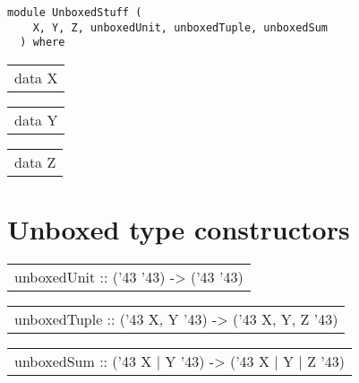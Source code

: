 \label{module:UnboxedStuff}
\haddockbeginheader
{\haddockverb\begin{verbatim}
module UnboxedStuff (
    X, Y, Z, unboxedUnit, unboxedTuple, unboxedSum
  ) where\end{verbatim}}
\haddockendheader

\begin{haddockdesc}
\item[\begin{tabular}{@{}l}
data X
\end{tabular}]
\end{haddockdesc}
\begin{haddockdesc}
\item[\begin{tabular}{@{}l}
data Y
\end{tabular}]
\end{haddockdesc}
\begin{haddockdesc}
\item[\begin{tabular}{@{}l}
data Z
\end{tabular}]
\end{haddockdesc}
\section{Unboxed type constructors
}
\begin{haddockdesc}
\item[\begin{tabular}{@{}l}
unboxedUnit :: ({\char '43} {\char '43}) -> ({\char '43} {\char '43})
\end{tabular}]
\item[\begin{tabular}{@{}l}
unboxedTuple :: ({\char '43} X, Y {\char '43}) -> ({\char '43} X, Y, Z {\char '43})
\end{tabular}]
\item[\begin{tabular}{@{}l}
unboxedSum :: ({\char '43} X | Y {\char '43}) -> ({\char '43} X | Y | Z {\char '43})
\end{tabular}]
\end{haddockdesc}